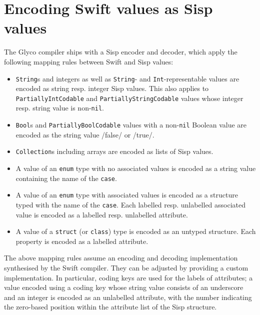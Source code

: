 \documentclass[main.tex]{subfiles}
\begin{document}
\section*{Encoding Swift values as Sisp values}
The Glyco compiler ships with a Sisp encoder and decoder, which apply the following mapping rules between Swift and Sisp values:
\begin{itemize}
	
	\item \texttt{String}s and integers as well as \texttt{String}- and \texttt{Int}-representable values are encoded as string resp. integer Sisp values. This also applies to \texttt{PartiallyIntCodable} and \texttt{PartiallyStringCodable} values whose integer resp. string value is non-\texttt{nil}.
	
	\item \texttt{Bool}s and \texttt{PartiallyBoolCodable} values with a non-\texttt{nil} Boolean value are encoded as the string value \iil/false/ or \iil/true/.
	
	\item \texttt{Collection}s including arrays are encoded as lists of Sisp values.
	
	\item A value of an \texttt{enum} type with no associated values is encoded as a string value containing the name of the \texttt{case}.
	
	\item A value of an \texttt{enum} type with associated values is encoded as a structure typed with the name of the \texttt{case}. Each labelled resp. unlabelled associated value is encoded as a labelled resp. unlabelled attribute.
	
	\item A value of a \texttt{struct} (or \texttt{class}) type is encoded as an untyped structure. Each property is encoded as a labelled attribute.
	
\end{itemize}

The above mapping rules assume an encoding and decoding implementation synthesised by the Swift compiler. They can be adjusted by providing a custom implementation. In particular, coding keys are used for the labels of attributes; a value encoded using a coding key whose string value consists of an underscore and an integer is encoded as an unlabelled attribute, with the number indicating the zero-based position within the attribute list of the Sisp structure.

\biblio{}
\onlyinsubfile{\glsaddall\printglossaries}
\end{document}
